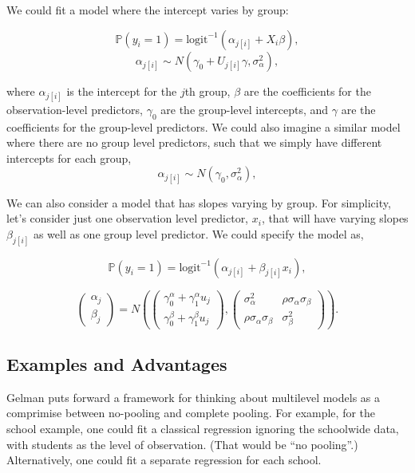 \documentclass[12pt,twoside]{reedthesis}
\begin{document}
  We could fit a model where the intercept varies by group:
  
  \[\mathbb{P} (y_i = 1) = \text{logit}^{-1}
  (\alpha_{j[i]} + X_i \beta),\]
  \[\alpha_{j[i]} \sim N(\gamma_0 + U_{j[i]} \gamma, \sigma_{\alpha}^2),\]
  
  where \(\alpha_{j[i]}\) is the intercept for the \(j\)th group,
  \(\beta\) are the coefficients for the observation-level predictors,
  \(\gamma_0\) are the group-level intercepts, and \(\gamma\) are the
  coefficients for the group-level predictors. We could also imagine a
  similar model where there are no group level predictors, such that we
  simply have different intercepts for each group,
  \[\alpha_{j[i]} \sim N(\gamma_0, \sigma_{\alpha}^2),\]
  
  We can also consider a model that has slopes varying by group. For
  simplicity, let's consider just one observation level predictor,
  \(x_i\), that will have varying slopes \(\beta_{j[i]}\) as well as one
  group level predictor. We could specify the model as,
  
  \[\mathbb{P} (y_i = 1) = \text{logit}^{-1}
  (\alpha_{j[i]} + \beta_{j[i]} x_i),\]
  
  \[
  \left(
  \begin{array}{c}
  \alpha_{j}\\
  \beta_{j}
  \end{array}
  \right) =
  N \left(
  \left(
  \begin{array}{c}
  \gamma_0^\alpha + \gamma_1^\alpha u_j\\
  \gamma_0^\beta + \gamma_1^\beta u_j
  \end{array}
  \right),
  \left(
  \begin{array}{cc}
  \sigma^2_\alpha & \rho \sigma_\alpha \sigma_\beta\\
  \rho \sigma_\alpha \sigma_\beta & \sigma^2_\beta
  \end{array}
  \right)
  \right).
  \]
  
  \subsection{Examples and Advantages}\label{examples-and-advantages}
  
  Gelman puts forward a framework for thinking about multilevel models as
  a comprimise between no-pooling and complete pooling. For example, for
  the school example, one could fit a classical regression ignoring the
  schoolwide data, with students as the level of observation. (That would
  be ``no pooling''.) Alternatively, one could fit a separate regression
  for each school.
  
\end{document}
